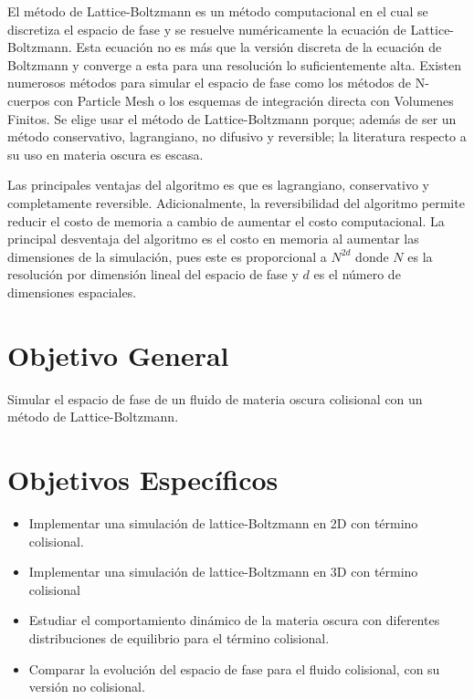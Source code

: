 \documentclass[12pt]{article}
\begin{document}
El método de Lattice-Boltzmann es un método computacional en el cual se discretiza el espacio de fase y se resuelve numéricamente la ecuación de Lattice-Boltzmann. Esta ecuación no es más que la versión discreta de la ecuación de Boltzmann y converge a esta para una resolución lo suficientemente alta. Existen numerosos métodos para simular el espacio de fase como los métodos de N-cuerpos con Particle Mesh o los esquemas de integración directa con Volumenes Finitos. Se elige usar el método de Lattice-Boltzmann porque; además de ser un método conservativo, lagrangiano, no difusivo y reversible; la literatura respecto a su uso en materia oscura es escasa.

Las principales ventajas del algoritmo es que es lagrangiano, conservativo y completamente reversible.\cite{integerLatticeDynamics} Adicionalmente, la reversibilidad del algoritmo permite reducir el costo de memoria a cambio de aumentar el costo computacional. La principal desventaja del algoritmo es el costo en memoria al aumentar las dimensiones de la simulación, pues este es proporcional a $N^{2d}$ donde $N$ es la resolución por dimensión lineal del espacio de fase y $d$ es el número de dimensiones espaciales.

\section{Objetivo General}


Simular el espacio de fase de un fluido de materia oscura colisional con un método de Lattice-Boltzmann.



\section{Objetivos Específicos}


\begin{itemize}
	\item Implementar una simulación de lattice-Boltzmann en 2D con término colisional.
	\item Implementar una simulación de lattice-Boltzmann en 3D con término colisional
	\item Estudiar el comportamiento dinámico de la materia oscura con diferentes distribuciones de equilibrio para el término colisional.
	\item Comparar la evolución del espacio de fase para el fluido colisional, con su versión no colisional.
\end{itemize}
\end{document}
